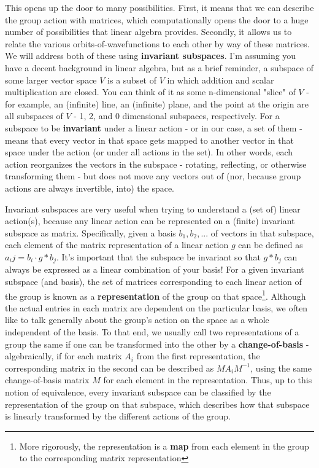 \documentclass{article}
\begin{document}
This opens up the door to many possibilities. First, it means that we can describe the group action with matrices, which computationally opens the door to a huge number of possibilities that linear algebra provides. Secondly, it allows us to relate the various orbits-of-wavefunctions to each other by way of these matrices. We will address both of these using \textbf{invariant subspaces}. I'm assuming you have a decent background in linear algebra, but as a brief reminder, a subspace of some larger vector space $V$ is a subset of $V$ in which addition and scalar multiplication are closed. You can think of it as some n-dimensional "slice" of $V$ - for example, an (infinite) line, an (infinite) plane, and the point at the origin are all subspaces of $V$ - 1, 2, and 0 dimensional subspaces, respectively. For a subspace to be \textbf{invariant} under a linear action - or in our case, a set of them - means that every vector in that space gets mapped to another vector in that space under the action (or under all actions in the set). In other words, each action reorganizes the vectors in the subspace - rotating, reflecting, or otherwise transforming them - but does not move any vectors out of (nor, because group actions are always invertible, into) the space.

Invariant subspaces are very useful when trying to understand a (set of) linear action(s), because any linear action can be represented on a (finite) invariant subspace as matrix. Specifically, given a basis ${b_1,b_2,...}$ of vectors in that subspace, each element of the matrix representation of a linear action $g$ can be defined as $a_ij = b_i\cdot g*b_j$. It's important that the subspace be invariant so that $g*b_j$ can always be expressed as a linear combination of your basis! For a given invariant subspace (and basis), the set of matrices corresponding to each linear action of the group is known as a \textbf{representation} of the group on that space\footnote{More rigorously, the representation is a \textbf{map} from each element in the group to the corresponding matrix representation}. Although the actual entries in each matrix are dependent on the particular basis, we often like to talk generally about the group's action on the space as a whole independent of the basis. To that end, we usually call two representations of a group the same if one can be transformed into the other by a \textbf{change-of-basis} - algebraically, if for each matrix $A_i$ from the first representation, the corresponding matrix in the second can be described as $MA_iM^{-1}$, using the same change-of-basis matrix $M$ for each element in the representation. Thus, up to this notion of equivalence, every invariant subspace can be classified by the representation of the group on that subspace, which describes how that subspace is linearly transformed by the different actions of the group.
\end{document}
